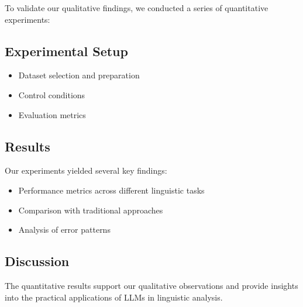 To validate our qualitative findings, we conducted a series of quantitative experiments:

\subsection{Experimental Setup}
\begin{itemize}
    \item Dataset selection and preparation
    \item Control conditions
    \item Evaluation metrics
\end{itemize}

\subsection{Results}
Our experiments yielded several key findings:
\begin{itemize}
    \item Performance metrics across different linguistic tasks
    \item Comparison with traditional approaches
    \item Analysis of error patterns
\end{itemize}

\subsection{Discussion}
The quantitative results support our qualitative observations and provide insights into the practical applications of LLMs in linguistic analysis. 